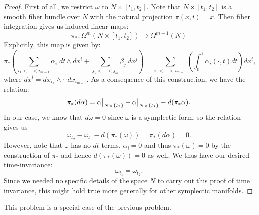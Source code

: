 \documentclass{pset}
\begin{document}
\begin{solution}
    \begin{proof}
        First of all, we restrict $\omega$ to $N\times [t_1, t_2]$. Note that $N\times [t_1, t_2]$ is a smooth fiber bundle over $N$ with the natural projection $\pi(x, t)=x$. Then fiber integration gives us induced linear maps:
        \[
            \pi_* : \Omega^m(N\times [t_1, t_2]) \to \Omega^{m-1}(N)
        \]
        Explicitly, this map is given by:
        \[
            \pi_*\left(\sum_{i_1<\cdots<i_{m-1}} \alpha_{i}\; dt\wedge dx^i + \sum_{j_1<\cdots<j_{m}} \beta_{j} \;dx^j\right) = \sum_{i_1<\cdots<i_{m-1}}\left(\int^1_0 \alpha_i(\cdot,t)dt\right) dx^i
        ,\] 
        where $dx^i=dx_{i_1}\wedge\cdots dx_{i_{m-1}}$. As a consequence of this construction, we have the relation:
        \[
            \pi_*(d\alpha) = \restr{\alpha}{N\times \{t_2\}} - \restr{\alpha}{N\times \{t_1\}} - d(\pi_* \alpha)
        .\] 
        In our case, we know that $d\omega = 0$ since $\omega$ is a symplectic form, so the relation gives us \[\omega_{t_2}-\omega_{t_1}-d(\pi_*(\omega))=\pi_*(d\alpha)=0.\]
        However, note that $\omega$ has no $dt$ terms, $\alpha_i=0$ and thus $\pi_*(\omega) = 0$ by the construction of $\pi_*$ and hence $d(\pi_*(\omega))=0$ as well. We thus have our desired time-invariance:
        \[
            \omega_{t_1} = \omega_{t_2}
        .\] 
        Since we needed no specific details of the space $N$ to carry out this proof of time invariance, this might hold true more generally for other symplectic manifolds.
    \end{proof}
\end{solution}

\begin{problem}
    This problem is a special case of the previous problem.
\end{problem}
\end{document}
